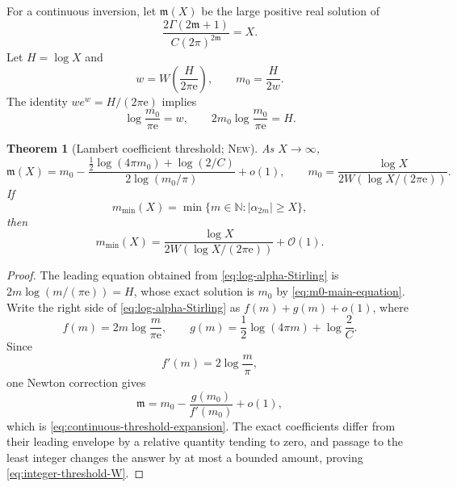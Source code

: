 \documentclass[11pt,oneside]{article}
\theoremstyle{frontier}
\newtheorem{theorem}{Theorem}[section]
\theoremstyle{definition}
\theoremstyle{remark}
\newcommand{\N}{\mathbb N}
\newcommand{\e}{\mathrm e}
\newcommand{\BigO}{\mathcal O}
\newcommand{\littleo}{o}
\newcommand{\statusnew}{\textsc{New}}
\begin{document}
For a continuous inversion, let $\mathfrak m(X)$ be the large positive real solution of
\begin{equation}
 \frac{2\Gamma(2\mathfrak m+1)}{C(2\pi)^{2\mathfrak m}}=X.
 \label{eq:continuous-threshold}
\end{equation}
Let $H=\log X$ and
\begin{equation}
 w=W\!\left(\frac{H}{2\pi\e}\right),
 \qquad
 m_0=\frac{H}{2w}.
 \label{eq:m0-W}
\end{equation}
The identity $we^w=H/(2\pi\e)$ implies
\begin{equation}
 \log\frac{m_0}{\pi\e}=w,
 \qquad
 2m_0\log\frac{m_0}{\pi\e}=H.
 \label{eq:m0-main-equation}
\end{equation}

\begin{theorem}[Lambert coefficient threshold; \statusnew]
\label{thm:Lambert-threshold}
As $X\to\infty$,
\begin{equation}
 \boxed{
 \mathfrak m(X)
 =m_0-
 \frac{\frac12\log(4\pi m_0)+\log(2/C)}
 {2\log(m_0/\pi)}
 +\littleo(1),
 \qquad
 m_0=\frac{\log X}{2W(\log X/(2\pi\e))}.
 }
 \label{eq:continuous-threshold-expansion}
\end{equation}
If
\begin{equation}
 m_{\min}(X)=\min\{m\in\N:|\alpha_{2m}|\ge X\},
 \label{eq:integer-threshold}
\end{equation}
then
\begin{equation}
 \boxed{
 m_{\min}(X)
 =\frac{\log X}{2W(\log X/(2\pi\e))}+\BigO(1).
 }
 \label{eq:integer-threshold-W}
\end{equation}
\end{theorem}

\begin{proof}
The leading equation obtained from \eqref{eq:log-alpha-Stirling} is
$2m\log(m/(\pi\e))=H$, whose exact solution is $m_0$ by
\eqref{eq:m0-main-equation}.  Write the right side of \eqref{eq:log-alpha-Stirling} as
$f(m)+g(m)+\littleo(1)$, where
\[
 f(m)=2m\log\frac{m}{\pi\e},
 \qquad
 g(m)=\frac12\log(4\pi m)+\log\frac2C.
\]
Since
\begin{equation*}
 f'(m)=2\log\frac m\pi,
\end{equation*}
one Newton correction gives
\[
 \mathfrak m=m_0-\frac{g(m_0)}{f'(m_0)}+\littleo(1),
\]
which is \eqref{eq:continuous-threshold-expansion}.  The exact coefficients differ from their
leading envelope by a relative quantity tending to zero, and passage to the least integer changes the
answer by at most a bounded amount, proving \eqref{eq:integer-threshold-W}.
\end{proof}
\end{document}
